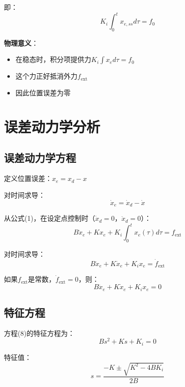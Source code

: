 \documentclass[12pt,a4paper]{article}
\begin{document}
即：
\begin{equation}
K_i \int_0^t x_{e,ss} d\tau = f_0
\end{equation}

\textbf{物理意义}：
\begin{itemize}
\item 在稳态时，积分项提供力$K_i \int x_e d\tau = f_0$
\item 这个力正好抵消外力$f_{\text{ext}}$
\item 因此位置误差为零
\end{itemize}

\section{误差动力学分析}

\subsection{误差动力学方程}

定义位置误差：$x_e = x_d - x$

对时间求导：
\begin{equation}
\dot{x}_e = \dot{x}_d - \dot{x}
\end{equation}

从公式(1)，在设定点控制时（$\dot{x}_d = 0$，$\ddot{x}_d = 0$）：
\begin{equation}
B\dot{x}_e + Kx_e + K_i \int_0^t x_e(\tau) d\tau = f_{\text{ext}}
\end{equation}

对时间求导：
\begin{equation}
B\ddot{x}_e + K\dot{x}_e + K_i x_e = \dot{f}_{\text{ext}} \tag{7}
\end{equation}

如果$f_{\text{ext}}$是常数，$\dot{f}_{\text{ext}} = 0$，则：
\begin{equation}
B\ddot{x}_e + K\dot{x}_e + K_i x_e = 0 \tag{8}
\end{equation}

\subsection{特征方程}

方程(8)的特征方程为：
\begin{equation}
Bs^2 + Ks + K_i = 0 \tag{9}
\end{equation}

特征值：
\begin{equation}
s = \frac{-K \pm \sqrt{K^2 - 4BK_i}}{2B} \tag{10}
\end{equation}
\end{document}
